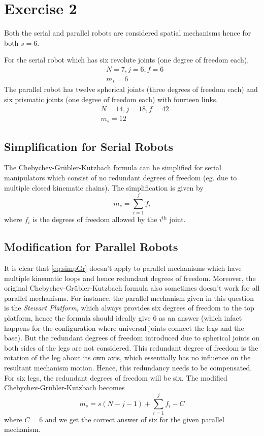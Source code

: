 \section{Exercise 2}
Both the serial and parallel robots are considered spatial mechanisms hence for both $s = 6$.

For the serial robot which has six revolute joints (one degree of freedom each), 
\begin{align*}
	&N = 7, j = 6, f = 6\\
	&m_s = 6
\end{align*}
The parallel robot has twelve spherical joints (three degrees of freedom each) and six prismatic joints (one degree of freedom each) with fourteen links.
\begin{align*}
	&N = 14, j = 18, f = 42\\
	&m_s = 12
\end{align*}

\subsection{Simplification for Serial Robots}
The Chebychev-Grübler-Kutzbach formula can be simplified for serial manipulators which consist of no redundant degrees of freedom (eg. due to multiple closed kinematic chains). The simplification is given by
\begin{equation}
	m_s = \sum_{i=1}^{j} f_i
	\label{eq:simpGr}
\end{equation}
where $f_i$ is the degrees of freedom allowed by the $i^{\text{th}}$ joint.
\subsection{Modification for Parallel Robots}
It is clear that \eqref{eq:simpGr} doesn't apply to parallel mechanisms which have multiple kinematic loops and hence redundant degrees of freedom. Moreover, the original Chebychev-Grübler-Kutzbach formula also sometimes doesn't work for all parallel mechanisms. For instance, the parallel mechanism given in this question is the \emph{Stewart Platform}, which always provides six degrees of freedom to the top platform, hence the formula should ideally give $6$ as an answer (which infact happens for the configuration where universal joints connect the legs and the base). But the redundant degrees of freedom introduced due to spherical joints on both sides of the legs are not considered. This redundant degree of freedom is the rotation of the leg about its own axis, which essentially has no influence on the resultant mechanism motion. Hence, this redundancy needs to be compensated. For six legs, the redundant degrees of freedom will be six. The modified Chebychev-Grübler-Kutzbach becomes
\begin{equation}
	m_s = s(N-j-1) + \sum_{i=1}^{j} f_i - C
\end{equation}
where $C = 6$ and we get the correct answer of six for the given parallel mechanism.